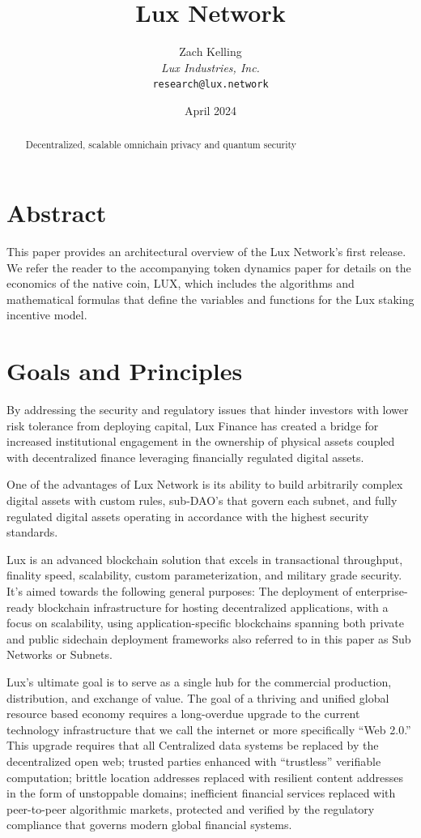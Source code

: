 \documentclass[11pt]{article}
\title{Lux Network}
\author{Zach Kelling\\\textit{Lux Industries, Inc.}\\\texttt{research@lux.network}}
\date{April 2024}
\begin{document}
\luxcoverpage

\begin{abstract}
Decentralized, scalable omnichain privacy and quantum security
\end{abstract}

\tableofcontents
\newpage


\section{Abstract}

This paper provides an architectural overview of the Lux Network's first release. We refer the reader to the accompanying token dynamics paper for details on the economics of the native coin, LUX, which includes the algorithms and mathematical formulas that define the variables and functions for the Lux staking incentive model.


\section{Goals and Principles}

By addressing the security and regulatory issues that hinder investors with lower risk tolerance from deploying capital, Lux Finance has created a bridge for increased institutional engagement in the ownership of physical assets coupled with decentralized finance leveraging financially regulated digital assets.


One of the advantages of Lux Network is its ability to build arbitrarily complex digital assets with custom rules, sub-DAO's that govern each subnet, and fully regulated digital assets operating in accordance with the highest security standards.


Lux is an advanced blockchain solution that excels in transactional throughput, finality speed, scalability, custom parameterization, and military grade security. It's aimed towards the following general purposes: The deployment of enterprise-ready blockchain infrastructure for hosting decentralized applications, with a focus on scalability, using application-specific blockchains spanning both private and public sidechain deployment frameworks also referred to in this paper as Sub Networks or Subnets.


Lux's ultimate goal is to serve as a single hub for the commercial production, distribution, and exchange of value. The goal of a thriving and unified global resource based economy requires a long-overdue upgrade to the current technology infrastructure that we call the internet or more specifically ``Web 2.0.'' This upgrade requires that all Centralized data systems be replaced by the decentralized open web; trusted parties enhanced with ``trustless'' verifiable computation; brittle location addresses replaced with resilient content addresses in the form of unstoppable domains; inefficient financial services replaced with peer-to-peer algorithmic markets, protected and verified by the regulatory compliance that governs modern global financial systems.
\end{document}
